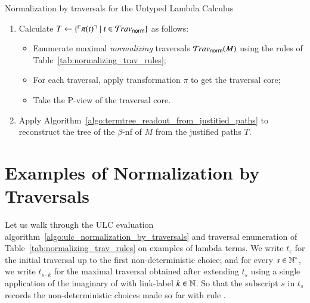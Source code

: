 \documentclass{elsarticle}
\theoremstyle{plain}
\theoremstyle{definition}
\theoremstyle{remark}
\newcommand{\normalizing}{{\sf norm}}
\newcommand{\travsetnorm}{\travset_\normalizing}
\def\coresymbol{\pi} %
\newcommand{\core}[1]{\coresymbol(#1)} %
\begin{document}
\begin{algorithm}%
\begin{algorithmic}
\caption{Normalization by traversals for the Untyped Lambda Calculus}
\label{algo:ulc_normalization_by_traversals}
\begin{enumerate}[nosep]
  \item Calculate $T \leftarrow \{ \pview{\core{t}} \ | \ t \in \travsetnorm \}$ as follows:
  \begin{itemize}[leftmargin=0.5em,nosep]
    \item Enumerate maximal \emph{normalizing} traversals $\travsetnorm(M)$ using the rules of Table~\ref{tab:normalizing_trav_rules};
    \item For each traversal, apply transformation $\coresymbol$ to get the traversal core;
    \item Take the P-view of the traversal core.
  \end{itemize}
  \item Apply Algorithm~\ref{algo:termtree_readout_from_justitied_paths} to reconstruct the tree of the $\beta$-nf of $M$ from the justified paths  $T$.
\end{enumerate}
\end{algorithmic}
\end{algorithm}

\section{Examples of Normalization by Traversals}
\label{sec:examples}
Let us walk through the ULC evaluation algorithm~\ref{algo:ulc_normalization_by_traversals} and traversal enumeration of Table~\ref{tab:normalizing_trav_rules} on examples of lambda terms. We write $t_\epsilon$  for the initial traversal up to the first non-deterministic choice; and for every $s \in \mathbb{N}^*$, we write $t_{s \cdot k}$ for the maximal traversal obtained after extending $t_s$ using a single application of the imaginary of   with link-label $k \in \mathbb{N}$. So that the subscript $s$ in $t_s$ records the non-deterministic choices made so far with rule .
\end{document}
